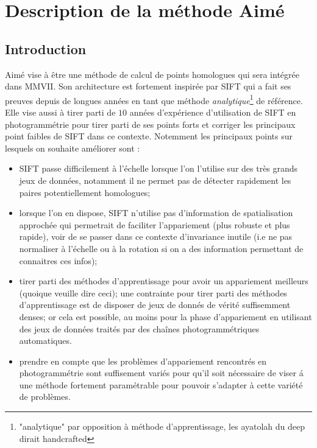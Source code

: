 
\chapter{Description de la m\'ethode Aim\'e}


\section{Introduction}

Aim\'e vise \`a \^etre une m\'ethode de calcul de points homologues qui sera  int\'egr\'ee dans MMVII. 
Son architecture est fortement inspir\'ee par SIFT qui a fait ses preuves depuis de longues
ann\'ees en tant que m\'ethode \emph{analytique}\footnote{"analytique" par opposition \`a  m\'ethode d'apprentissage,
les ayatolah du deep dirait handcrafted} de r\'ef\'erence. Elle vise aussi \`a tirer parti de $10$ ann\'ees
d'exp\'erience d'utilisation de SIFT en photogramm\'etrie pour tirer parti de ses points forts
et corriger les principaux point faibles
de SIFT dans ce contexte.  Notemment les principaux points  sur lesquels on souhaite am\'eliorer sont :


\begin{itemize}
   \item SIFT passe difficilement \`a l'\'echelle lorsque  l'on l'utilise sur des tr\`es grands jeux de donn\'ees,
         notamment il ne permet pas de d\'etecter rapidement les paires potentiellement homologues;

   \item lorsque l'on en dispose, SIFT n'utilise pas d'information  de spatialisation approch\'ee qui permetrait
         de faciliter l'appariement (plus robuste et plus rapide), voir de se passer dans ce contexte d'invariance
         inutile (i.e ne pas normaliser \`a l'\'echelle ou \`a la rotation si on a des information permettant de
         connaitres ces infos);

   \item tirer parti des m\'ethodes d'apprentissage pour avoir un appariement meilleurs (quoique veuille dire
         ceci); une contrainte pour tirer parti des m\'ethodes d'apprentissage est de disposer de  jeux de
         donn\'es de v\'erit\'e suffisemment denses; or cela est possible, au moins pour la phase d'appariement 
         en utilisant des jeux de donn\'ees trait\'es par des cha\^ines photogramm\'etriques automatiques.

   \item prendre en compte que les probl\`emes d'appariement rencontr\'es en photogramm\'etrie sont
         suffisement vari\'es pour qu'il soit n\'ecessaire de viser \'a une m\'ethode fortement param\'etrable
         pour pouvoir s'adapter \`a cette vari\'et\'e de probl\`emes.


\end{itemize}

